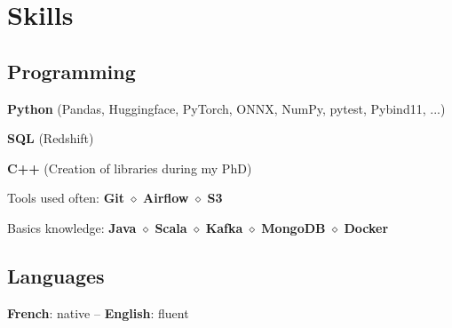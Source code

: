 \documentclass[]{deedy-resume-openfont}
\begin{document}
\begin{minipage}[t]{0.39\textwidth}


	\section{Skills}
	\vspace{0.1cm}

	\subsection{Programming}

	\vspace{\topsep}
	\vspace{0.1cm}
	\begin{tightemize}
		\item[\diamond] \textbf{Python} (Pandas, Huggingface, PyTorch, ONNX, NumPy, pytest, Pybind11, ...)
		\item[\diamond] \textbf{SQL} (Redshift)
		\item[\diamond] \textbf{C++} (Creation of libraries during my PhD)
		\item[\diamond] Tools used often: \textbf{Git} $\diamond$ \textbf{Airflow} $\diamond$ \textbf{S3}
		\item[\diamond] Basics knowledge: \textbf{Java} $\diamond$ \textbf{Scala} $\diamond$ \textbf{Kafka} $\diamond$ \textbf{MongoDB} $\diamond$ \textbf{Docker}
	\end{tightemize}

	\sectionsep
	\vspace{0.1cm}
	\subsection{Languages}
	\vspace{0.1cm}
	\textbf{French}: native -- \textbf{English}: fluent


\end{minipage}
\end{document}
